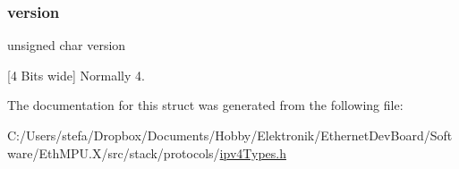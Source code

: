 \mbox{\label{structipv4_header___a278ac8112eb4d891fdffa2a26fb4de69}} 
\subsubsection{\texorpdfstring{version}{version}}
{\footnotesize\ttfamily unsigned char version}



\mbox{[}4 Bits wide\mbox{]} Normally 4. 



The documentation for this struct was generated from the following file\+:\begin{DoxyCompactItemize}
\item 
C\+:/\+Users/stefa/\+Dropbox/\+Documents/\+Hobby/\+Elektronik/\+Ethernet\+Dev\+Board/\+Software/\+Eth\+M\+P\+U.\+X/src/stack/protocols/\mbox{\hyperlink{ipv4_types_8h}{ipv4\+Types.\+h}}\end{DoxyCompactItemize}
